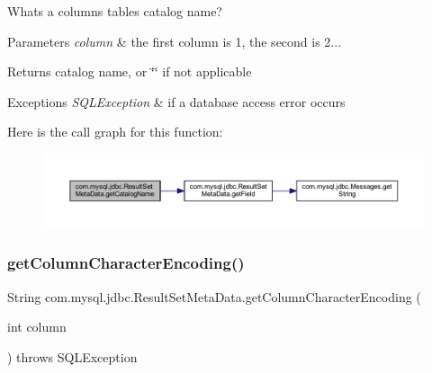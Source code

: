 What\textquotesingle{}s a column\textquotesingle{}s table\textquotesingle{}s catalog name?


\begin{DoxyParams}{Parameters}
{\em column} & the first column is 1, the second is 2...\\
\hline
\end{DoxyParams}
\begin{DoxyReturn}{Returns}
catalog name, or \char`\"{}\char`\"{} if not applicable
\end{DoxyReturn}

\begin{DoxyExceptions}{Exceptions}
{\em S\+Q\+L\+Exception} & if a database access error occurs \\
\hline
\end{DoxyExceptions}
Here is the call graph for this function\+:
\nopagebreak
\begin{figure}[H]
\begin{center}
\leavevmode
\includegraphics[width=350pt]{classcom_1_1mysql_1_1jdbc_1_1_result_set_meta_data_ac2f12bbb6c31b08fd76a5a7a76801542_cgraph}
\end{center}
\end{figure}
\mbox{\label{classcom_1_1mysql_1_1jdbc_1_1_result_set_meta_data_a92e9d337ceb0d64f40d1d4045f8e580c}} 
\subsubsection{\texorpdfstring{get\+Column\+Character\+Encoding()}{getColumnCharacterEncoding()}}
{\footnotesize\ttfamily String com.\+mysql.\+jdbc.\+Result\+Set\+Meta\+Data.\+get\+Column\+Character\+Encoding (\begin{DoxyParamCaption}\item[{int}]{column }\end{DoxyParamCaption}) throws S\+Q\+L\+Exception}

